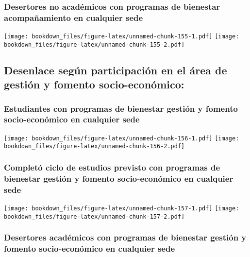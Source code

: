 \documentclass[]{article}
\theoremstyle{definition}
\theoremstyle{definition}
\theoremstyle{definition}
\theoremstyle{remark}
\begin{document}
\subsubsection{Desertores no académicos con programas de bienestar
acompañamiento en cualquier
sede}\label{desertores-no-academicos-con-programas-de-bienestar-acompanamiento-en-cualquier-sede}

\texttt{[image: bookdown\_files/figure-latex/unnamed-chunk-155-1.pdf]}
\texttt{[image: bookdown\_files/figure-latex/unnamed-chunk-155-2.pdf]}

\subsection{Desenlace según participación en el área de gestión y
fomento
socio-económico:}\label{desenlace-segun-participacion-en-el-area-de-gestion-y-fomento-socio-economico}

\subsubsection{Estudiantes con programas de bienestar gestión y fomento
socio-económico en cualquier
sede}\label{estudiantes-con-programas-de-bienestar-gestion-y-fomento-socio-economico-en-cualquier-sede}

\texttt{[image: bookdown\_files/figure-latex/unnamed-chunk-156-1.pdf]}
\texttt{[image: bookdown\_files/figure-latex/unnamed-chunk-156-2.pdf]}

\subsubsection{Completó ciclo de estudios previsto con programas de
bienestar gestión y fomento socio-económico en cualquier
sede}\label{completo-ciclo-de-estudios-previsto-con-programas-de-bienestar-gestion-y-fomento-socio-economico-en-cualquier-sede}

\texttt{[image: bookdown\_files/figure-latex/unnamed-chunk-157-1.pdf]}
\texttt{[image: bookdown\_files/figure-latex/unnamed-chunk-157-2.pdf]}

\subsubsection{Desertores académicos con programas de bienestar gestión
y fomento socio-económico en cualquier
sede}\label{desertores-academicos-con-programas-de-bienestar-gestion-y-fomento-socio-economico-en-cualquier-sede}
\end{document}
